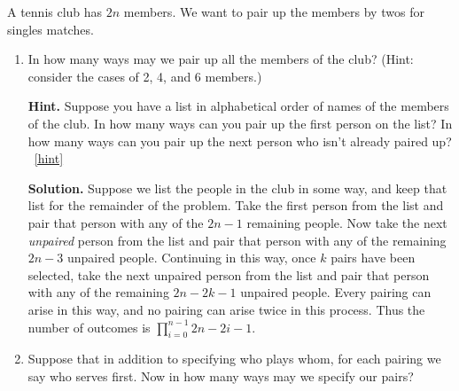 \documentclass{book}
\begin{document}
\setcounter{project}{86}
\addtocounter{project}{-1}
\begin{activity}[]\label{tennispairings1}
\hypertarget{p-662}{}%
A tennis club has \(2n\) members. We want to pair up the members by twos for singles matches.%
\begin{enumerate}[font=\bfseries,label=(\alph*),ref=\alph*]
\item\label{task-134} \hypertarget{p-663}{}%
In how many ways may we pair up all the members of the club? (Hint: consider the cases of 2, 4, and 6 members.)%
\par\smallskip%
\noindent\textbf{Hint.}\hypertarget{hint-40}{}\quad%
\hypertarget{p-664}{}%
Suppose you have a list in alphabetical order of names of the members of the club. In how many ways can you pair up the first person on the list? In how many ways can you pair up the next person who isn't already paired up?%
~\hfill{\tiny\hyperlink{a-86.a}{[hint]}\hypertarget{q-86.a}{}}\par\smallskip%
\noindent\textbf{Solution.}\hypertarget{solution-54}{}\quad%
\hypertarget{p-665}{}%
Suppose we list the people in the club in some way, and keep that list for the remainder of the problem. Take the first person from the list and pair that person with any of the \(2n-1\) remaining people. Now take the next \emph{unpaired} person from the list and pair that person with any of the remaining \(2n-3\) unpaired people. Continuing in this way, once \(k\) pairs have been selected, take the next unpaired person from the list and pair that person with any of the remaining \(2n-2k-1\) unpaired people. Every pairing can arise in this way, and no pairing can arise twice in this process. Thus the number of outcomes is \(\prod_{i=0}^{n-1} 2n-2i-1\).%
\item\label{task-135} \hypertarget{p-666}{}%
Suppose that in addition to specifying who plays whom, for each pairing we say who serves first.  Now in how many ways may we specify our pairs?%
\end{enumerate}
\end{activity}
\end{document}
